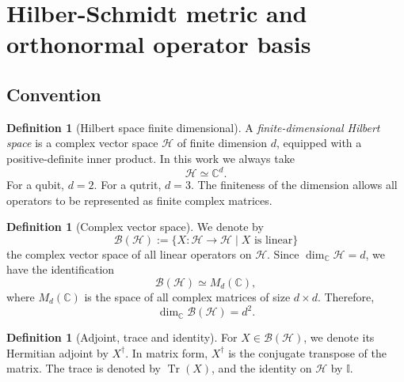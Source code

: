 \documentclass[notitlepage,aip,reprint,onecolumn]{revtex4-1}
\theoremstyle{definition}
\newtheorem{definition}[theorem]{Definition}
\begin{document}
\section{Hilber-Schmidt metric and orthonormal operator basis}\label{Sec:Hilber-Schmidt metric and orthonormal basis}

\subsection{Convention}\label{SubSec:Conventions}
\begin{definition}[Hilbert space finite dimensional]
A \emph{finite-dimensional Hilbert space} is a complex vector space \(\mathcal H\) of finite dimension \(d\), equipped with a positive-definite inner product. In this work we always take
\[
     \mathcal H\simeq \mathbb C^d.
\]
For a qubit, \(d=2\). For a qutrit, \(d=3\). The finiteness of the dimension allows all operators to be represented as finite complex matrices.
\end{definition}
\begin{definition}[Complex vector space]
We denote by
\[
     \mathcal B(\mathcal H):=\{X:\mathcal H\to\mathcal H\mid X \text{ is linear}\}
\]
the complex vector space of all linear operators on \(\mathcal H\). Since \(\dim_{\mathbb C}\mathcal H=d\), we have the identification
\[
     \mathcal B(\mathcal H)\simeq M_d(\mathbb C),
\]
where \(M_d(\mathbb C)\) is the space of all complex matrices of size \(d\times d\). Therefore,
\[
     \dim_{\mathbb C}\mathcal B(\mathcal H)=d^2.
\]
\end{definition}
\begin{definition}[Adjoint, trace and identity]
For \(X\in\mathcal B(\mathcal H)\), we denote its Hermitian adjoint by \(X^\dagger\). In matrix form, \(X^\dagger\) is the conjugate transpose of the matrix. The trace is denoted by \(\operatorname{Tr}(X)\), and the identity on \(\mathcal H\) by \(\mathbb I\).
\end{definition}
\end{document}
